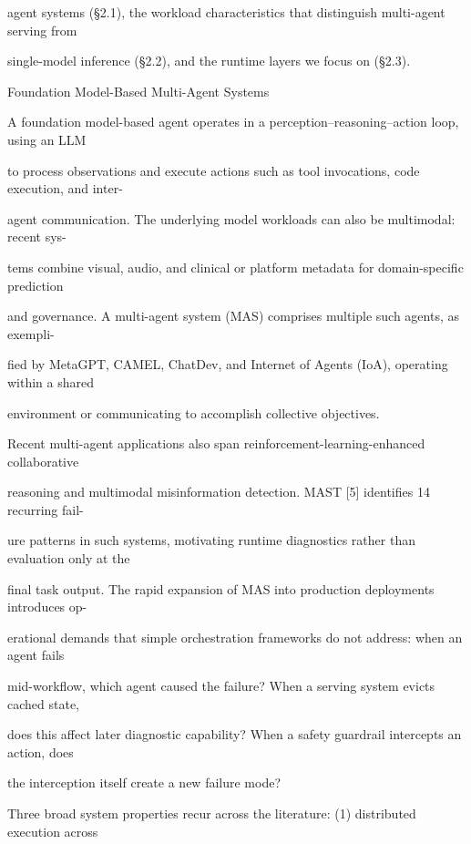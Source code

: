 \begin{flushleft}
\noindent agent systems (§2.1), the workload characteristics that distinguish multi-agent serving from\par
\noindent single-model inference (§2.2), and the runtime layers we focus on (§2.3).\par
\par\smallskip
{} Foundation Model-Based Multi-Agent Systems\par
\noindent A foundation model-based agent operates in a perception–reasoning–action loop, using an LLM\par
\noindent to process observations and execute actions such as tool invocations, code execution, and inter-\par
\noindent agent communication. The underlying model workloads can also be multimodal: recent sys-\par
\noindent tems combine visual, audio, and clinical or platform metadata for domain-specific prediction\par
\noindent and governance. A multi-agent system (MAS) comprises multiple such agents, as exempli-\par
\noindent fied by MetaGPT, CAMEL, ChatDev, and Internet of Agents (IoA), operating within a shared\par
\noindent environment or communicating to accomplish collective objectives.\par
\noindent  Recent multi-agent applications also span reinforcement-learning-enhanced collaborative\par
\noindent reasoning and multimodal misinformation detection. MAST [5] identifies 14 recurring fail-\par
\noindent ure patterns in such systems, motivating runtime diagnostics rather than evaluation only at the\par
\noindent final task output. The rapid expansion of MAS into production deployments introduces op-\par
\noindent erational demands that simple orchestration frameworks do not address: when an agent fails\par
\noindent mid-workflow, which agent caused the failure? When a serving system evicts cached state,\par
\noindent does this affect later diagnostic capability? When a safety guardrail intercepts an action, does\par
\noindent the interception itself create a new failure mode?\par
\noindent  Three broad system properties recur across the literature: (1) distributed execution across\par

\end{flushleft}
